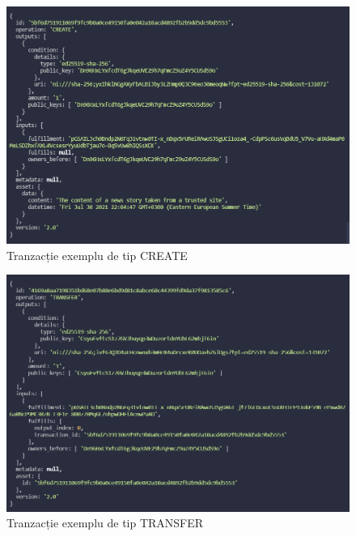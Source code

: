 \clearpage

\begin{figure}[H]
\centering
\includegraphics[scale=0.6]{Images/BCDB_Create_Transaction.png}
\caption{Tranzacție exemplu de tip CREATE}
\end{figure}

\begin{figure}[H] 
\centering
\includegraphics[scale=0.6]{Images/BCDB_Transfer_Transaction.png}
\caption{Tranzacție exemplu de tip TRANSFER}
\end{figure}